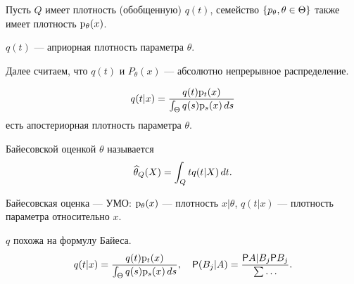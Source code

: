     Пусть \(Q\) имеет плотность (обобщенную) \(q(t)\), семейство \(\left\{p_\theta, \theta \in \Theta\right\}\) также имеет плотность \(\mathrm{p}_{\theta}{\left(x\right)}\).

    \begin{definition}
        \(q(t)\) --- априорная плотность параметра \(\theta\).
    \end{definition}

    \begin{remark}
        Далее считаем, что \(q(t)\) и \(P_\theta(x)\) --- абсолютно непрерывное распределение.
    \end{remark}

    \begin{definition}
        \begin{displaymath}
            q(t | x) = \frac{q(t) \mathrm{p}_{t}{\left(x\right)}}{\int_\Theta q(s) \mathrm{p}_{s}{\left(x\right)} \mathop{}\!d s}
        \end{displaymath}
        есть апостериорная плотность параметра \(\theta\).
    \end{definition}

    \begin{definition}
        Байесовской оценкой \(\theta\) называется
        \begin{displaymath}
            \widehat{\theta}_Q(X) = \int_Q t q(t | X) \mathop{}\!d t.
        \end{displaymath}
    \end{definition}

    Байесовская оценка --- УМО:
    \(\mathrm{p}_{\theta}{\left(x\right)}\) --- плотность \(x | \theta\), \(q(t | x)\) --- плотность параметра относительно \(x\).

    \(q\) похожа на формулу Байеса.
        \begin{displaymath}
            q(t | x) = \frac{q(t) \mathrm{p}_{t}{\left(x\right)}}{\int_\Theta q(s) \mathrm{p}_{s}{\left(x\right)} \mathop{}\!d s}, \quad
            \mathsf{P}(B_j | A) = \frac{\mathsf{P}{A | B_j} \mathsf{P}{B_j}}{\sum \ldots}.
        \end{displaymath}


